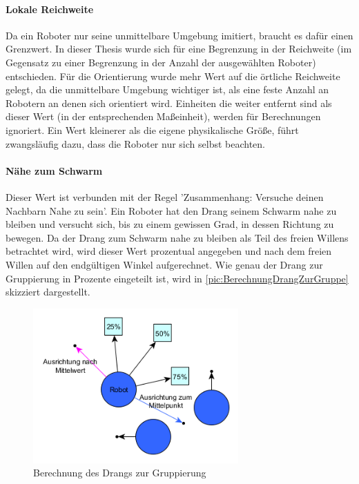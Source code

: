 \paragraph*{Lokale Reichweite} Da ein Roboter nur seine unmittelbare Umgebung imitiert, braucht es dafür einen Grenzwert. In dieser Thesis wurde sich für eine Begrenzung in der Reichweite (im Gegensatz zu einer Begrenzung in der Anzahl der ausgewählten Roboter) entschieden. Für die Orientierung wurde mehr Wert auf die örtliche Reichweite gelegt, da die unmittelbare Umgebung wichtiger ist, als eine feste Anzahl an Robotern an denen sich orientiert wird. Einheiten die weiter entfernt sind als dieser Wert (in der entsprechenden Maßeinheit), werden für Berechnungen ignoriert. Ein Wert kleinerer als die eigene physikalische Größe, führt zwangsläufig dazu, dass die Roboter nur sich selbst beachten.

\paragraph*{Nähe zum Schwarm} Dieser Wert ist verbunden mit der Regel 'Zusammenhang: Versuche deinen Nachbarn Nahe zu sein'. Ein Roboter hat den Drang seinem Schwarm nahe zu bleiben und versucht sich, bis zu einem gewissen Grad, in dessen Richtung zu bewegen. Da der Drang zum Schwarm nahe zu bleiben als Teil des freien Willens betrachtet wird, wird dieser Wert prozentual angegeben und nach dem freien Willen auf den endgültigen Winkel aufgerechnet. Wie genau der Drang zur Gruppierung in Prozente eingeteilt ist, wird in \autoref{pic:BerechnungDrangZurGruppe} skizziert dargestellt.

\begin{figure}[h]
	\centering
	\includegraphics[width=0.7\textwidth,keepaspectratio]{graphics/BerechnungDrangZurGruppe.png}
	\caption{Berechnung des Drangs zur Gruppierung}
	\label{pic:BerechnungDrangZurGruppe}
\end{figure}


